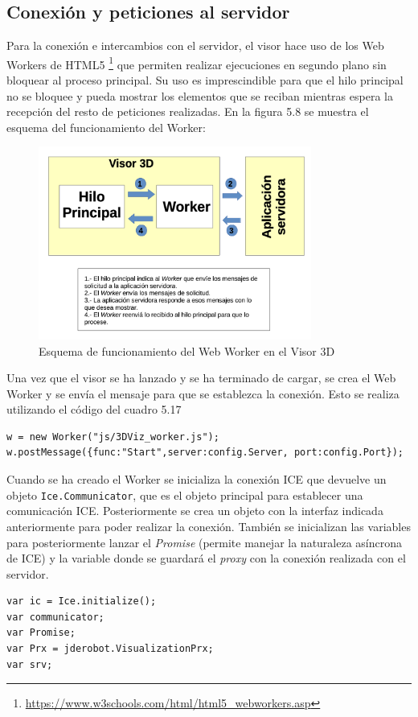 \subsection{Conexión y peticiones al servidor}
Para la conexión e intercambios con el servidor, el visor hace uso de los Web Workers de HTML5 \footnote{\url{https://www.w3schools.com/html/html5_webworkers.asp}} que permiten realizar ejecuciones en segundo plano sin bloquear al proceso principal. Su uso es imprescindible para que el hilo principal no se bloquee y pueda mostrar los elementos que se reciban mientras espera la recepción del resto de peticiones realizadas. En la figura 5.8 se muestra el esquema del funcionamiento del Worker:

\begin{figure}[H]
  \begin{center}
    \includegraphics[width=0.8\textwidth]{figures/esquemaworker.png}
		\caption{Esquema de funcionamiento del Web Worker en el Visor 3D}
		\label{fig.diseno3dviz}
		\end{center}
\end{figure}

Una vez que el visor se ha lanzado y se ha terminado de cargar, se crea el Web Worker y se envía el mensaje para que se establezca la conexión. Esto se realiza utilizando el código del cuadro 5.17

\begin{lstlisting}[caption= Creación del Worker, label=cod.worker]
w = new Worker("js/3DViz_worker.js");
w.postMessage({func:"Start",server:config.Server, port:config.Port});
\end{lstlisting}

Cuando se ha creado el Worker se inicializa la conexión ICE que devuelve un objeto \texttt{Ice.Communicator}, que es el objeto principal para establecer una comunicación ICE. Posteriormente se crea un objeto con la interfaz indicada anteriormente para poder realizar la conexión. También se inicializan las variables para posteriormente lanzar el \textit{Promise} (permite manejar la naturaleza asíncrona de ICE) y la variable donde se guardará el \textit{proxy} con la conexión realizada con el servidor.
\begin{lstlisting}[caption= Código para la inicialización de la conexión ICE, label=cod.inicializarice]
var ic = Ice.initialize();
var communicator;
var Promise;
var Prx = jderobot.VisualizationPrx;
var srv;
\end{lstlisting}

